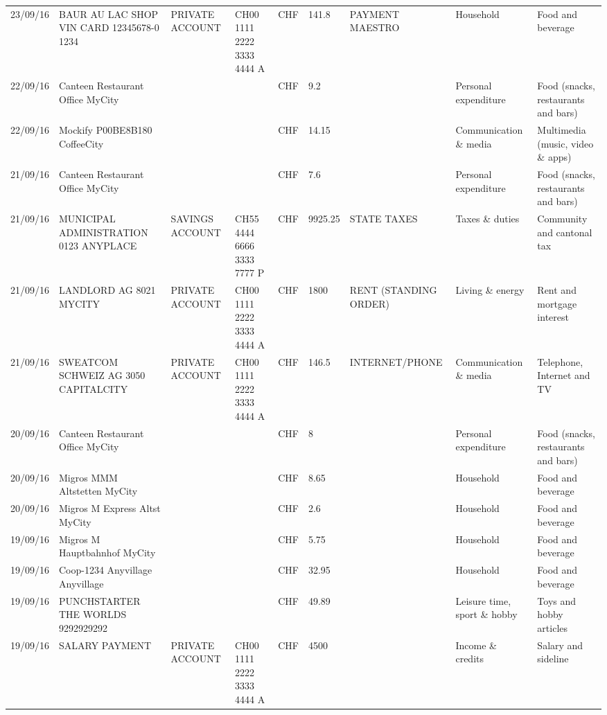 \begin{landscape}
\begin{center}
\begin{longtable}{lllllllll}
		23/09/16 & BAUR AU LAC SHOP VIN CARD 12345678-0 1234 & PRIVATE ACCOUNT & CH00 1111 2222 3333 4444 A & CHF   & 141.8 & PAYMENT MAESTRO & Household & Food and beverage \\
		22/09/16 & Canteen Restaurant Office      MyCity &       &       & CHF   & 9.2   &       & Personal expenditure & Food (snacks, restaurants and bars) \\
		22/09/16 & Mockify P00BE8B180       CoffeeCity &       &       & CHF   & 14.15 &       & Communication \& media & Multimedia (music, video \& apps) \\
		21/09/16 & Canteen Restaurant Office      MyCity &       &       & CHF   & 7.6   &       & Personal expenditure & Food (snacks, restaurants and bars) \\
		21/09/16 & MUNICIPAL ADMINISTRATION 0123 ANYPLACE & SAVINGS ACCOUNT & CH55 4444 6666 3333 7777 P & CHF   & 9925.25 & STATE TAXES & Taxes \& duties & Community and cantonal tax \\
		21/09/16 & LANDLORD AG 8021 MYCITY & PRIVATE ACCOUNT & CH00 1111 2222 3333 4444 A & CHF   & 1800  & RENT (STANDING ORDER) & Living \& energy & Rent and mortgage interest \\
		21/09/16 & SWEATCOM SCHWEIZ AG 3050 CAPITALCITY & PRIVATE ACCOUNT & CH00 1111 2222 3333 4444 A & CHF   & 146.5 & INTERNET/PHONE & Communication \& media & Telephone,  Internet and TV \\
		20/09/16 & Canteen Restaurant Office      MyCity &       &       & CHF   & 8     &       & Personal expenditure & Food (snacks, restaurants and bars) \\
		20/09/16 & Migros MMM Altstetten    MyCity &       &       & CHF   & 8.65  &       & Household & Food and beverage \\
		20/09/16 & Migros M Express Altst   MyCity &       &       & CHF   & 2.6   &       & Household & Food and beverage \\
		19/09/16 & Migros M Hauptbahnhof    MyCity &       &       & CHF   & 5.75  &       & Household & Food and beverage \\
		19/09/16 & Coop-1234 Anyvillage    Anyvillage &       &       & CHF   & 32.95 &       & Household & Food and beverage \\
		19/09/16 & PUNCHSTARTER THE WORLDS   9292929292 &       &       & CHF   & 49.89 &       & Leisure time, sport \& hobby & Toys and hobby articles \\
		19/09/16 & SALARY PAYMENT & PRIVATE ACCOUNT & CH00 1111 2222 3333 4444 A & CHF   & 4500  &       & Income \& credits & Salary and sideline \\

\end{longtable}
\end{center}
\end{landscape}
